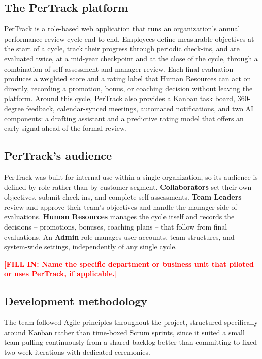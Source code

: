 \documentclass[12pt,a4paper]{report}
\newcommand{\fillin}[1]{\textcolor{red}{\textbf{[FILL IN: #1]}}}
\begin{document}
\subsection{The PerTrack platform}

PerTrack is a role-based web application that runs an organization's annual performance-review cycle end to end. Employees define measurable objectives at the start of a cycle, track their progress through periodic check-ins, and are evaluated twice, at a mid-year checkpoint and at the close of the cycle, through a combination of self-assessment and manager review. Each final evaluation produces a weighted score and a rating label that Human Resources can act on directly, recording a promotion, bonus, or coaching decision without leaving the platform. Around this cycle, PerTrack also provides a Kanban task board, 360-degree feedback, calendar-synced meetings, automated notifications, and two AI components: a drafting assistant and a predictive rating model that offers an early signal ahead of the formal review.

\subsection{PerTrack's audience}

PerTrack was built for internal use within a single organization, so its audience is defined by role rather than by customer segment. \textbf{Collaborators} set their own objectives, submit check-ins, and complete self-assessments. \textbf{Team Leaders} review and approve their team's objectives and handle the manager side of evaluations. \textbf{Human Resources} manages the cycle itself and records the decisions -- promotions, bonuses, coaching plans -- that follow from final evaluations. An \textbf{Admin} role manages user accounts, team structures, and system-wide settings, independently of any single cycle.

\fillin{Name the specific department or business unit that piloted or uses PerTrack, if applicable.}

\subsection{Development methodology}

The team followed Agile principles throughout the project, structured specifically around Kanban rather than time-boxed Scrum sprints, since it suited a small team pulling continuously from a shared backlog better than committing to fixed two-week iterations with dedicated ceremonies.
\end{document}
